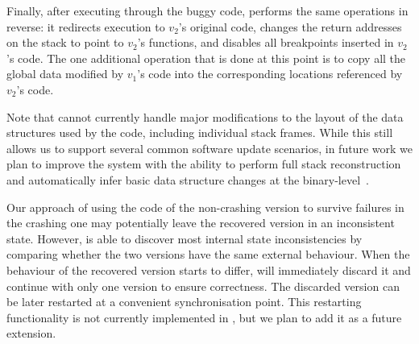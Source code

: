 Finally, after executing through the buggy code, \rem performs the
same operations in reverse: it redirects execution to $v_2$'s original
code, changes the return addresses on the stack to point to $v_2$'s
functions, and disables all breakpoints inserted in $v_2$'s code.  
The one additional operation that is done at this point is to copy all
the global data modified by $v_1$'s code into the corresponding
locations referenced by $v_2$'s code.  




Note that \mx cannot currently handle major modifications to the
layout of the data structures used by the code, including individual
stack frames.  While this still allows us to support several common
software update scenarios, in future work we plan to improve the
system with the ability to perform full stack
reconstruction~\cite{upstare} and automatically infer basic data
structure changes at the binary-level~\cite{data-struct-digging}.


Our approach of using the code of the non-crashing version to survive
failures in the crashing one may potentially leave the recovered
version in an inconsistent state. However, \mx is able to discover
most internal state inconsistencies by comparing whether the two
versions have the same external behaviour. When the behaviour of the
recovered version starts to differ, \mx will immediately discard it
and continue with only one version to ensure correctness. The
discarded version can be later restarted at a convenient
synchronisation point.  This restarting functionality is not currently
implemented in \mx, but we plan to add it as a future extension.

